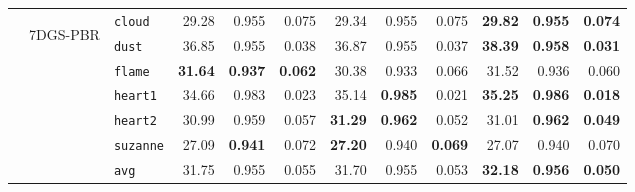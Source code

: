 \documentclass{article}
\theoremstyle{plain}
\theoremstyle{definition}
\theoremstyle{remark}
\begin{document}
\begin{table}[bp]
{\begin{tabular}{@{\hskip 2pt}cc|@{\hskip 2pt}l@{\hskip 2pt}|@{\hskip 2pt}r@{\hskip 2pt}r@{\hskip 2pt}r|@{\hskip 2pt}r@{\hskip 2pt}r@{\hskip 2pt}r|@{\hskip 2pt}r@{\hskip 2pt}r@{\hskip 2pt}r@{\hskip 2pt}}


& \multirow{7}{*}{\begin{sideways}7DGS-PBR\end{sideways}}
    & \texttt{cloud}    & 29.28 & 0.955 & 0.075 & 29.34 & 0.955 & 0.075 & \bf 29.82 & \bf 0.955 & \bf 0.074 \\
    & & \texttt{dust}     & 36.85 & 0.955 & 0.038 & 36.87 & 0.955 &  0.037 & \bf 38.39 & \bf 0.958 & \bf 0.031 \\
    & & \texttt{flame}    & \bf 31.64 & \bf 0.937 & \bf 0.062 & 30.38 & 0.933 & 0.066 & 31.52 & 0.936 & 0.060 \\
    & & \texttt{heart1}   & 34.66 & 0.983 & 0.023 & 35.14 & \bf 0.985 & 0.021 &  \bf 35.25 & \bf 0.986 & \bf 0.018 \\
    & & \texttt{heart2}   & 30.99 & 0.959 & 0.057 & \bf 31.29 & \bf 0.962 & 0.052 & 31.01 & \bf 0.962 & \bf 0.049 \\
    & & \texttt{suzanne}  & 27.09 & \bf 0.941 & 0.072 & \bf 27.20 & 0.940 & \bf 0.069 & 27.07 & 0.940 & 0.070 \\
    \cmidrule{3-12}
        & & \texttt{avg}
          & 31.75
          & 0.955
          & 0.055
          & 31.70
          & 0.955
          & 0.053
          & \bf 32.18
          & \bf 0.956
          & \bf 0.050 \\
    \cmidrule{2-12}


\end{tabular}}
\end{table}
\end{document}
